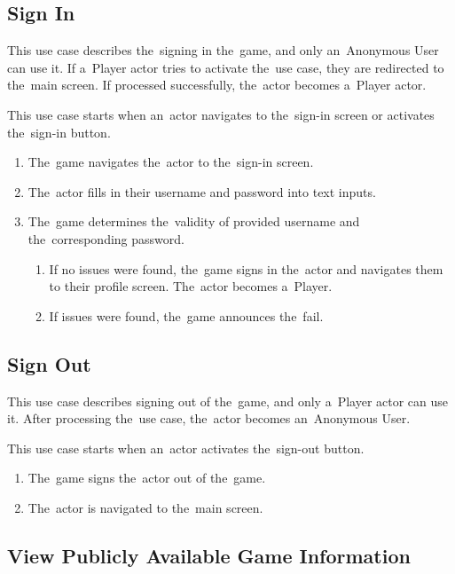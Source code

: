 \subsection{Sign In}

This use case describes the~signing in the~game, and only an~Anonymous User can use it. If a~Player actor tries to activate the~use case, they are redirected to the~main screen.
If processed successfully, the~actor becomes a~Player actor.

This use case starts when an~actor navigates to the~sign-in screen or activates the~sign-in button.

\begin{enumerate}
    \item The~game navigates the~actor to the~sign-in screen.
    \item The~actor fills in their username and password into text inputs.
    \item The~game determines the~validity of provided username and the~corresponding password.
    \begin{enumerate}
        \item If no issues were found, the~game signs in the~actor and navigates them to their profile screen. The~actor becomes a~Player.
        \item If issues were found, the~game announces the~fail.
    \end{enumerate}
\end{enumerate}

\subsection{Sign Out}

This use case describes signing out of the~game, and only a~Player actor can use it.
After processing the~use case, the~actor becomes an~Anonymous User.

This use case starts when an~actor activates the~sign-out button.

\begin{enumerate}
    \item The~game signs the~actor out of the~game.
    \item The~actor is navigated to the~main screen.
\end{enumerate}

\subsection{View Publicly Available Game Information}

